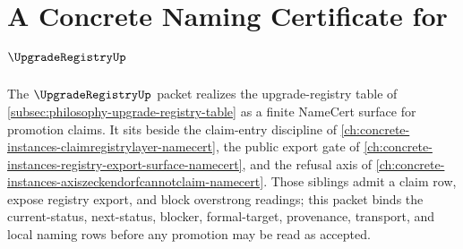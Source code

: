\chapter{A Concrete Naming Certificate for $\UpgradeRegistryUp$}
\label{ch:concrete-instances-upgraderegistry-namecert}

The $\UpgradeRegistryUp$ packet realizes the upgrade-registry table of \autoref{subsec:philosophy-upgrade-registry-table} as a finite NameCert surface for promotion claims. It sits beside the claim-entry discipline of \autoref{ch:concrete-instances-claimregistrylayer-namecert}, the public export gate of \autoref{ch:concrete-instances-registry-export-surface-namecert}, and the refusal axis of \autoref{ch:concrete-instances-axiszeckendorfcannotclaim-namecert}. Those siblings admit a claim row, expose registry export, and block overstrong readings; this packet binds the current-status, next-status, blocker, formal-target, provenance, transport, and local naming rows before any promotion may be read as accepted.

